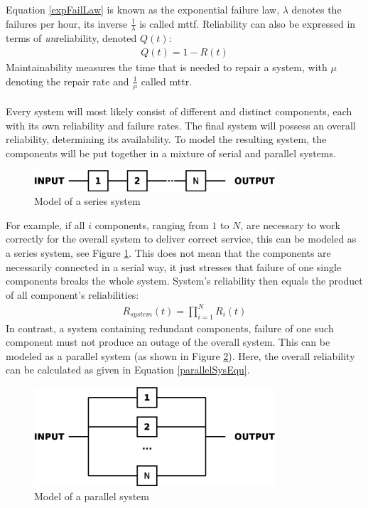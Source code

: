 Equation \ref{expFailLaw} is known as the exponential failure law, $\lambda$ denotes the failures per hour, its inverse $\frac{1}{\lambda}$ is
called \gls{mttf}. Reliability can also be expressed in terms of \textit{un}reliability, denoted $Q(t)$:
\begin{align}
 Q(t) = 1 - R(t)
\end{align}
Maintainability measures the time that is needed to repair a system, with $\mu$ denoting the repair rate and $\frac{1}{\mu}$ called \gls{mttr}.
\\
\\
Every system will most likely consist of different and distinct components, each with its own reliability and failure rates. The final system
will possess an overall reliability, determining its availability. To model the resulting system, the components will be put together in a mixture of
serial and parallel systems.
\begin{figure}
    \centering
    \includegraphics[width=0.8\textwidth]{figures/seriesSystem.eps}
    \caption{Model of a series system}
    \label{fig:serSys}
\end{figure}
For example, if all $i$ components, ranging from $1$ to $N$, are necessary to work correctly for the overall system to deliver correct service, this can be modeled as
a series system, see Figure \ref{fig:serSys}. This does not mean that the components are necessarily connected in a serial way, it just stresses that failure
of one single components breaks the whole system. System's reliability then equals the product of all component's reliabilities:
\begin{align}
R_{system}(t) = \prod_{i=1}^{N} R_{i}(t) 
\end{align}
In contrast, a system containing redundant components, failure of one such component must not produce an outage of the overall system. This can be modeled as
a parallel system (as shown in Figure \ref{fig:parallelSys}). Here, the overall reliability can be calculated as given in Equation \ref{parallelSysEqu}.
\begin{figure}
    \centering
    \includegraphics[width=0.8\textwidth]{figures/parallelSys.eps}
    \caption{Model of a parallel system}
    \label{fig:parallelSys}
\end{figure}


